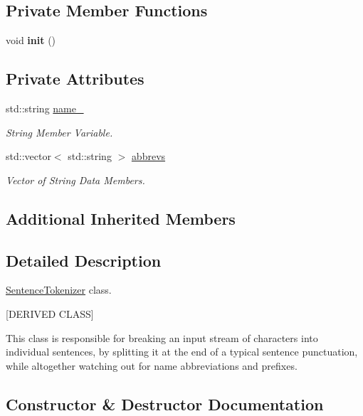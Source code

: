 \subsection*{Private Member Functions}
\begin{DoxyCompactItemize}
\item 
\mbox{\label{class_sentence_tokenizer_aa9f63e2a3f706fff9b7d65aa31c5d4d1}} 
void {\bfseries init} ()
\end{DoxyCompactItemize}
\subsection*{Private Attributes}
\begin{DoxyCompactItemize}
\item 
std\+::string \hyperlink{class_sentence_tokenizer_a7c3ce1b9636d33b34aedc21c1b9f552b}{name\+\_\+}
\begin{DoxyCompactList}\small\item\em String Member Variable. \end{DoxyCompactList}\item 
std\+::vector$<$ std\+::string $>$ \hyperlink{class_sentence_tokenizer_a925161446748331a428a289e459c6e53}{abbrevs}
\begin{DoxyCompactList}\small\item\em Vector of String Data Members. \end{DoxyCompactList}\end{DoxyCompactItemize}
\subsection*{Additional Inherited Members}


\subsection{Detailed Description}
\hyperlink{class_sentence_tokenizer}{Sentence\+Tokenizer} class. 

\mbox{[}D\+E\+R\+I\+V\+ED C\+L\+A\+SS\mbox{]}

This class is responsible for breaking an input stream of characters into individual sentences, by splitting it at the end of a typical sentence punctuation, while altogether watching out for name abbreviations and prefixes. 

\subsection{Constructor \& Destructor Documentation}
\mbox{\label{class_sentence_tokenizer_a7ac4c0f31e4066808cb2f4e8f1aee545}} 
